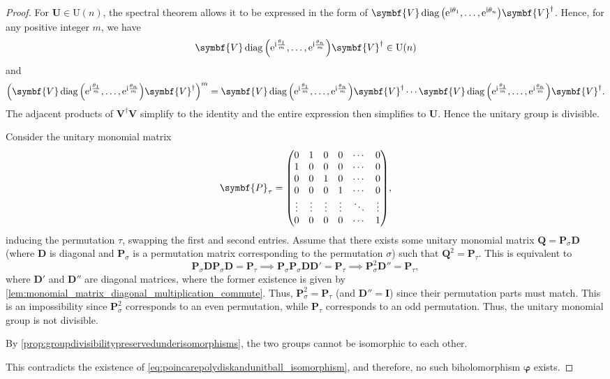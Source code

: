 \begin{proof}
    For \(\symbf{U}\in\mathrm{U}(n)\), the spectral theorem allows it to be expressed in the form of \(\symbf{V}\operatorname{diag}\qty(\ee^{\ii\theta_1},\ldots,\ee^{\ii\theta_n})\symbf{V}^\dagger\). Hence, for any positive integer \(m\), we have \[\symbf{V}\operatorname{diag}\qty(\ee^{\ii\frac{\theta_1}m},\ldots,\ee^{\ii\frac{\theta_n}m})\symbf{V}^\dagger\in\mathrm{U}(n)\] and \[\qty(\symbf{V}\operatorname{diag}\qty(\ee^{\ii\frac{\theta_1}m},\ldots,\ee^{\ii\frac{\theta_n}m})\symbf{V}^\dagger)^m=\symbf{V}\operatorname{diag}\qty(\ee^{\ii\frac{\theta_1}m},\ldots,\ee^{\ii\frac{\theta_n}m})\symbf{V}^\dagger\cdots\symbf{V}\operatorname{diag}\qty(\ee^{\ii\frac{\theta_1}m},\ldots,\ee^{\ii\frac{\theta_n}m})\symbf{V}^\dagger.\] The adjacent products of \(\symbf{V}^\dagger\symbf{V}\) simplify to the identity and the entire expression then simplifies to \(\symbf{U}\). Hence the unitary group is divisible.

    Consider the unitary monomial matrix \[\symbf{P}_\tau=\mqty(0&1&0&0&\cdots&0\\1&0&0&0&\cdots&0\\0&0&1&0&\cdots&0\\0&0&0&1&\cdots&0\\\vdots&\vdots&\vdots&\vdots&\ddots&\vdots\\0&0&0&0&\cdots&1),\] inducing the permutation \(\tau\), swapping the first and second entries. Assume that there exists some unitary monomial matrix \(\symbf{Q}=\symbf{P}_\sigma\symbf{D}\) (where \(\symbf{D}\) is diagonal and \(\symbf{P}_\sigma\) is a permutation matrix corresponding to the permutation \(\sigma\)) such that \(\symbf{Q}^2=\symbf{P}_\tau\). This is equivalent to \[\symbf{P}_\sigma\symbf{D}\symbf{P}_\sigma\symbf{D}=\symbf{P}_\tau\implies\symbf{P}_\sigma\symbf{P}_\sigma\symbf{D}\symbf{D}'=\symbf{P}_\tau\implies\symbf{P}^2_\sigma\symbf{D}''=\symbf{P}_\tau,\]
    where \(\symbf{D}'\) and \(\symbf{D}''\) are diagonal matrices, where the former existence is given by \cref{lem:monomial_matrix_diagonal_multiplication_commute}. Thus, \(\symbf{P}^2_\sigma=\symbf{P}_\tau\) (and \(\symbf{D}''=\symbf{I}\)) since their permutation parts must match. This is an impossibility since \(\symbf{P}^2_\sigma\) corresponds to an even permutation, while \(\symbf{P}_\tau\) corresponds to an odd permutation. Thus, the unitary monomial group is not divisible.

    By \cref{prop:groupdivisibilitypreservedunderisomorphisms}, the two groups cannot be isomorphic to each other.

    This contradicts the existence of \cref{eq:poincarepolydiskandunitball_isomorphism}, and therefore, no such biholomorphism \(\symbf{\varphi}\) exists.
\end{proof}
